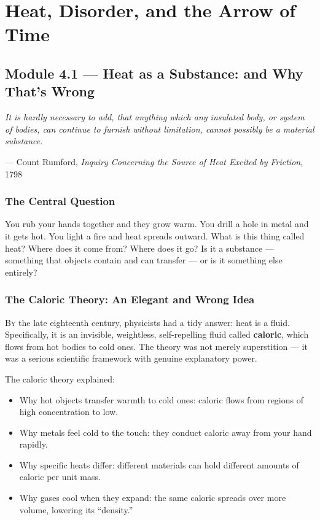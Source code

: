 \documentclass[12pt, a4paper, twoside]{book}
\begin{document}
\tableofcontents

\chapter{Heat, Disorder, and the Arrow of Time}

\section{Module 4.1 — Heat as a Substance: and Why That's Wrong}
\label{sec:caloric}

\epigraph{\itshape
  It is hardly necessary to add, that anything which any insulated body,
  or system of bodies, can continue to furnish without limitation,
  cannot possibly be a material substance.
}{--- Count Rumford, \textit{Inquiry Concerning the Source of Heat Excited by Friction}, 1798}

\subsection{The Central Question}

\begin{puzzlebox}
You rub your hands together and they grow warm. You drill a hole in metal and it gets hot. You light a fire and heat spreads outward. What is this thing called heat? Where does it come from? Where does it go? Is it a substance --- something that objects contain and can transfer --- or is it something else entirely?
\end{puzzlebox}

\subsection{The Caloric Theory: An Elegant and Wrong Idea}

\lettrine[lines=3,loversize=0.08]{\textcolor{accent}{B}}{y} the late eighteenth century, physicists had a tidy answer: heat is a fluid. Specifically, it is an invisible, weightless, self-repelling fluid called \textbf{caloric}, which flows from hot bodies to cold ones. The theory was not merely superstition --- it was a serious scientific framework with genuine explanatory power.

The caloric theory explained:
\begin{itemize}[leftmargin=2em,itemsep=2pt]
  \item Why hot objects transfer warmth to cold ones: caloric flows from regions of high concentration to low.
  \item Why metals feel cold to the touch: they conduct caloric away from your hand rapidly.
  \item Why specific heats differ: different materials can hold different amounts of caloric per unit mass.
  \item Why gases cool when they expand: the same caloric spreads over more volume, lowering its ``density.''
\end{itemize}
\end{document}
